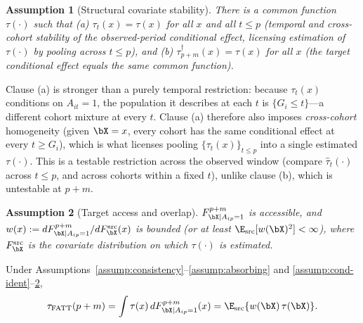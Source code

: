 \documentclass{article}
\newtheorem{assumption}{Assumption}
\begin{document}
\begin{assumption}[Structural covariate stability]
\label{assump:covariate-stability}
There is a common function $\tau(\cdot)$ such that (a) $\tau_t(x) = \tau(x)$ for all $x$ and all $t \leq p$ (temporal and cross-cohort stability of the observed-period conditional effect, licensing estimation of $\tau(\cdot)$ by pooling across $t\le p$), and (b) $\tau^{\dagger}_{p+m}(x) = \tau(x)$ for all $x$ (the target conditional effect equals the same common function).
\end{assumption}

\begin{remark}
\label{rem:cross-cohort}
Clause (a) is stronger than a purely temporal restriction: because $\tau_t(x)$ conditions on $A_{it}=1$, the population it describes at each $t$ is $\{G_i\leq t\}$---a different cohort mixture at every $t$. Clause (a) therefore also imposes \emph{cross-cohort} homogeneity (given $\bX=x$, every cohort has the same conditional effect at every $t\ge G_i$), which is what licenses pooling $\{\tau_t(x)\}_{t\le p}$ into a single estimated $\tau(\cdot)$. This is a testable restriction across the observed window (compare $\widehat\tau_t(\cdot)$ across $t\le p$, and across cohorts within a fixed $t$), unlike clause (b), which is untestable at $p+m$.
\end{remark}

\begin{assumption}[Target access and overlap]
\label{assump:target}
$F^{p+m}_{\bX\mid A_{ip}=1}$ is accessible, and $w(x) := dF^{p+m}_{\bX\mid A_{ip}=1}/dF^{\mathrm{src}}_{\bX}(x)$ is bounded (or at least $\E_{\mathrm{src}}[w(\bX)^2]<\infty$), where $F^{\mathrm{src}}_\bX$ is the covariate distribution on which $\tau(\cdot)$ is estimated.
\end{assumption}

\begin{proposition}
\label{prop:path3}
Under Assumptions~\ref{assump:consistency}--\ref{assump:absorbing} and \ref{assump:cond-ident}--\ref{assump:target},
\[
\tau_{\mathrm{FATT}}(p+m) = \int \tau(x)\, dF^{p+m}_{\bX\mid A_{ip}=1}(x) = \E_{\mathrm{src}}\{w(\bX)\,\tau(\bX)\}.
\]
\end{proposition}
\end{document}

